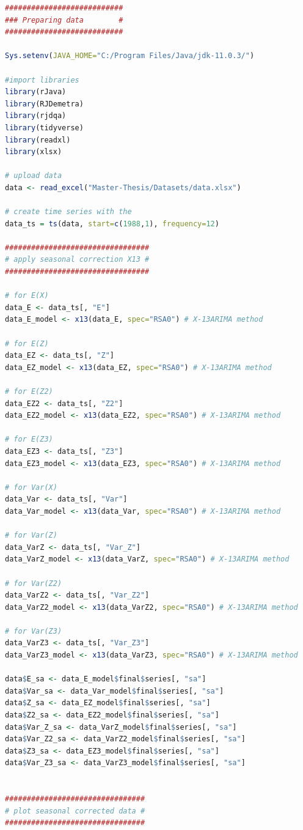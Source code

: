 \documentclass[12pt,a4paper,oneside]{book}
\begin{document}
\begin{lstlisting}[language=R]
###########################
### Preparing data        #
###########################

Sys.setenv(JAVA_HOME="C:/Program Files/Java/jdk-11.0.3/")

#import libraries
library(rJava)
library(RJDemetra)
library(rjdqa)
library(tidyverse)
library(readxl)
library(xlsx)

# upload data
data <- read_excel("Master-Thesis/Datasets/data.xlsx")

# create time series with the 
data_ts = ts(data, start=c(1988,1), frequency=12)

#################################
# apply seasonal correction X13 #
#################################

# for E(X)
data_E <- data_ts[, "E"]
data_E_model <- x13(data_E, spec="RSA0") # X-13ARIMA method

# for E(Z)
data_EZ <- data_ts[, "Z"]
data_EZ_model <- x13(data_EZ, spec="RSA0") # X-13ARIMA method

# for E(Z2)
data_EZ2 <- data_ts[, "Z2"]
data_EZ2_model <- x13(data_EZ2, spec="RSA0") # X-13ARIMA method

# for E(Z3)
data_EZ3 <- data_ts[, "Z3"]
data_EZ3_model <- x13(data_EZ3, spec="RSA0") # X-13ARIMA method

# for Var(X)
data_Var <- data_ts[, "Var"]
data_Var_model <- x13(data_Var, spec="RSA0") # X-13ARIMA method

# for Var(Z)
data_VarZ <- data_ts[, "Var_Z"]
data_VarZ_model <- x13(data_VarZ, spec="RSA0") # X-13ARIMA method

# for Var(Z2)
data_VarZ2 <- data_ts[, "Var_Z2"]
data_VarZ2_model <- x13(data_VarZ2, spec="RSA0") # X-13ARIMA method

# for Var(Z3)
data_VarZ3 <- data_ts[, "Var_Z3"]
data_VarZ3_model <- x13(data_VarZ3, spec="RSA0") # X-13ARIMA method

data$E_sa <- data_E_model$final$series[, "sa"]
data$Var_sa <- data_Var_model$final$series[, "sa"]
data$Z_sa <- data_EZ_model$final$series[, "sa"]
data$Z2_sa <- data_EZ2_model$final$series[, "sa"]
data$Var_Z_sa <- data_VarZ_model$final$series[, "sa"]
data$Var_Z2_sa <- data_VarZ2_model$final$series[, "sa"]
data$Z3_sa <- data_EZ3_model$final$series[, "sa"]
data$Var_Z3_sa <- data_VarZ3_model$final$series[, "sa"]


################################
# plot seasonal corrected data #
################################


\end{lstlisting}
\end{document}
